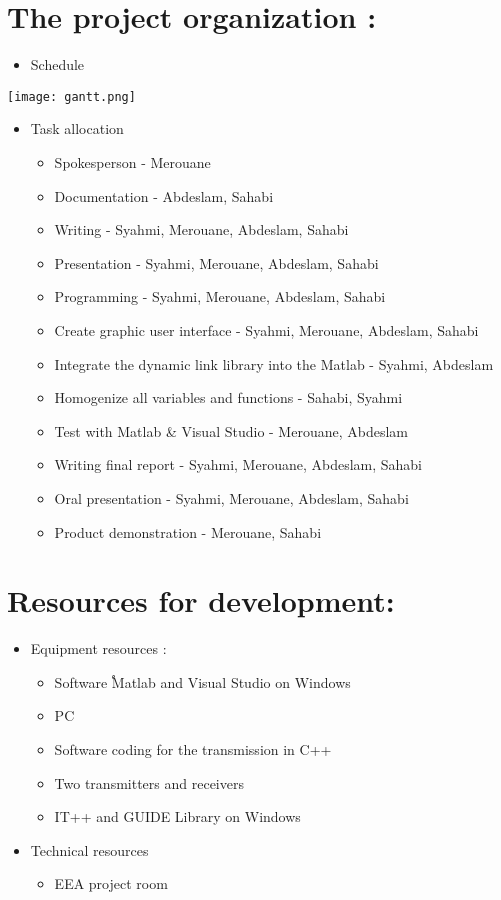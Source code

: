 \documentclass[12pt,a4paper]{article}
\begin{document}
\section{The project organization :}
\begin{itemize}
\item Schedule
\end{itemize}
\texttt{[image: gantt.png]}
\begin{itemize}
\clearpage
\item Task allocation
	\begin{itemize}
	\item Spokesperson - Merouane
\item Documentation - Abdeslam, Sahabi
\item Writing - Syahmi, Merouane, Abdeslam, Sahabi   
\item Presentation - Syahmi, Merouane, Abdeslam, Sahabi 
\item Programming - Syahmi, Merouane, Abdeslam, Sahabi 
\item Create graphic user interface - Syahmi, Merouane, Abdeslam, Sahabi 
\item Integrate the dynamic link library into the Matlab - Syahmi, Abdeslam 
\item Homogenize all variables and functions - Sahabi, Syahmi
\item Test with Matlab \& Visual Studio - Merouane, Abdeslam
\item Writing final report - Syahmi, Merouane, Abdeslam, Sahabi 
\item Oral presentation - Syahmi, Merouane, Abdeslam, Sahabi 
\item Product demonstration - Merouane, Sahabi
	\end{itemize}
\end{itemize}


\section{Resources for development:}
\begin{itemize}
\item Equipment resources :
	\begin{itemize}
		\item Software ֠Matlab and Visual Studio on Windows 
		\item PC
		\item Software coding for the transmission in C++
		\item Two transmitters and receivers
		\item IT++ and GUIDE Library on Windows 
	\end{itemize}
	
\item Technical resources
	\begin{itemize}
		\item EEA project room
	\end{itemize}
\end{itemize}
\end{document}
